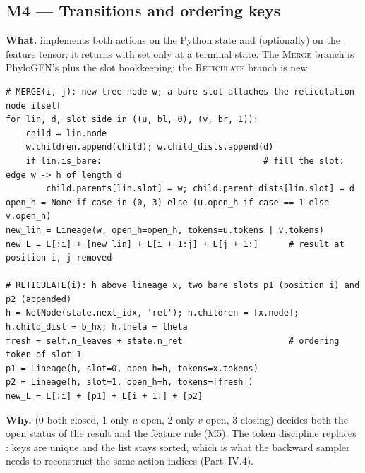 \subsection{M4 --- Transitions and ordering keys}
\textbf{What.}  implements both actions on the Python state and (optionally) on the feature tensor; it returns  with  set only at a terminal state. The \textsc{Merge} branch is PhyloGFN's  plus the slot bookkeeping; the \textsc{Reticulate} branch is new.
\begin{lstlisting}
# MERGE(i, j): new tree node w; a bare slot attaches the reticulation node itself
for lin, d, slot_side in ((u, bl, 0), (v, br, 1)):
    child = lin.node
    w.children.append(child); w.child_dists.append(d)
    if lin.is_bare:                                # fill the slot: edge w -> h of length d
        child.parents[lin.slot] = w; child.parent_dists[lin.slot] = d
open_h = None if case in (0, 3) else (u.open_h if case == 1 else v.open_h)
new_lin = Lineage(w, open_h=open_h, tokens=u.tokens | v.tokens)
new_L = L[:i] + [new_lin] + L[i + 1:j] + L[j + 1:]      # result at position i, j removed

# RETICULATE(i): h above lineage x, two bare slots p1 (position i) and p2 (appended)
h = NetNode(state.next_idx, 'ret'); h.children = [x.node]; h.child_dist = b_hx; h.theta = theta
fresh = self.n_leaves + state.n_ret                     # ordering token of slot 1
p1 = Lineage(h, slot=0, open_h=h, tokens=x.tokens)
p2 = Lineage(h, slot=1, open_h=h, tokens=[fresh])
new_L = L[:i] + [p1] + L[i + 1:] + [p2]
\end{lstlisting}
\textbf{Why.}  (0 both closed, 1 only $u$ open, 2 only $v$ open, 3 closing) decides both the open status of the result and the feature rule (M5). The token discipline replaces : keys are unique and the list stays sorted, which is what the backward sampler needs to reconstruct the same action indices (Part~IV.4).

